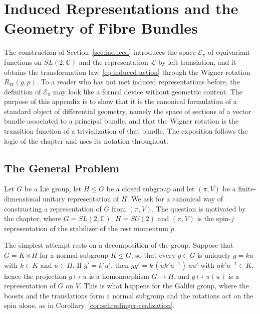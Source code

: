 	\chapter{Induced Representations and the Geometry of Fibre Bundles}
	\label{app:induced-geometry}
	
	The construction of Section~\ref{sec:induced} introduces the space $\mathcal{E}_\pi$ of equivariant functions on $SL(2,\mathbb{C})$ and the representation $\mathcal{L}$ by left translation, and it obtains the transformation law~\eqref{eq:induced-action} through the Wigner rotation $R_W(g,p)$. To a reader who has not met induced representations before, the definition of $\mathcal{E}_\pi$ may look like a formal device without geometric content. The purpose of this appendix is to show that it is the canonical formulation of a standard object of differential geometry, namely the space of sections of a vector bundle associated to a principal bundle, and that the Wigner rotation is the transition function of a trivialization of that bundle. The exposition follows the logic of the chapter and uses its notation throughout.
	
	\section{The General Problem}
	\label{sec:induced-problem}
	
	Let $G$ be a Lie group, let $H\le G$ be a closed subgroup and let $(\pi,V)$ be a finite-dimensional unitary representation of $H$. We ask for a canonical way of constructing a representation of $G$ from $(\pi,V)$. The question is motivated by the chapter, where $G=SL(2,\mathbb{C})$, $H=SU(2)$ and $(\pi,V)$ is the spin-$j$ representation of the stabilizer of the rest momentum $\mathring{p}$.
	
	The simplest attempt rests on a decomposition of the group. Suppose that $G=K\rtimes H$ for a normal subgroup $K\trianglelefteq G$, so that every $g\in G$ is uniquely $g=ku$ with $k\in K$ and $u\in H$. If $g'=k'u'$, then $gg'=k\,(uk'u^{-1})\,uu'$ with $uk'u^{-1}\in K$, hence the projection $g\mapsto u$ is a homomorphism $G\to H$, and $g\mapsto\pi(u)$ is a representation of $G$ on $V$. This is what happens for the Galilei group, where the boosts and the translations form a normal subgroup and the rotations act on the spin alone, as in Corollary~\ref{cor:schrodinger-realization}.
	
